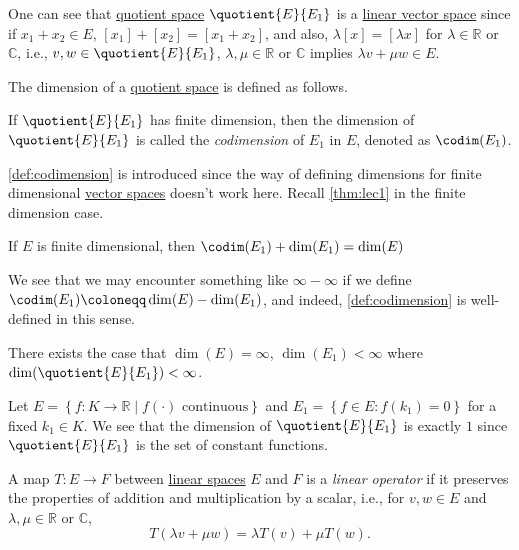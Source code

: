 One can see that \hyperref[def:quotient-space]{quotient space} \(\quotient{E}{E_1} \) is a \hyperref[def:linear-vector-space]{linear vector space} since if \(x_1 + x_2\in E\), \([x_1] + [x_2] = [x_1 + x_2]\), and also, \(\lambda [x] = [\lambda x]\) for \(\lambda \in \mathbb{R} \) or \(\mathbb{C} \), i.e., \(v, w\in \quotient{E}{E_1} \), \(\lambda , \mu \in\mathbb{R} \) or \(\mathbb{C} \) implies \(\lambda v + \mu w\in E\).

The dimension of a \hyperref[def:quotient-space]{quotient space} is defined as follows.

\begin{definition}[Codimension]\label{def:codimension}
	If \(\quotient{E}{E_1} \) has finite dimension, then the dimension of \(\quotient{E}{E_1} \) is called the \emph{codimension} of \(E_1\) in \(E\), denoted as \(\codim(E_1)\).
\end{definition}

\autoref{def:codimension} is introduced since the way of defining dimensions for finite dimensional \hyperref[def:linear-vector-space]{vector spaces} doesn't work here. Recall \autoref{thm:lec1} in the finite dimension case.

\begin{theorem}\label{thm:lec1}
	If \(E\) is finite dimensional, then \(\codim(E_1) + \dim (E_1) = \dim(E)\)
\end{theorem}

We see that we may encounter something like \(\infty - \infty \) if we define \(\codim(E_1) \coloneqq \dim(E) - \dim(E_1)\), and indeed, \autoref{def:codimension} is well-defined in this sense.

\begin{eg}
	There exists the case that \(\dim(E) = \infty \), \(\dim(E_1) < \infty\) where \(\dim(\quotient{E}{E_1} )<\infty \).
\end{eg}
\begin{explanation}
	Let \(E = \left\{ f\colon K\to \mathbb{R} \mid f(\cdot) \text{ continuous}  \right\} \) and \(E_1 = \left\{ f\in E\colon f(k_1) = 0 \right\} \) for a fixed \(k_1\in K\). We see that the dimension of \(\quotient{E}{E_1} \) is exactly \(1\) since \(\quotient{E}{E_1} \) is the set of constant functions.
\end{explanation}

\begin{definition}\label{def:linear-op}
	A map \(T\colon E\to F\) between \hyperref[def:linear-vector-space]{linear spaces} \(E\) and \(F\) is a \emph{linear operator} if it preserves the properties of addition and multiplication by a scalar, i.e., for \(v, w\in E\) and \(\lambda , \mu \in \mathbb{R}\) or \(\mathbb{C}\),
	\[
		T(\lambda v + \mu w) = \lambda T(v) + \mu T(w).
	\]
\end{definition}

